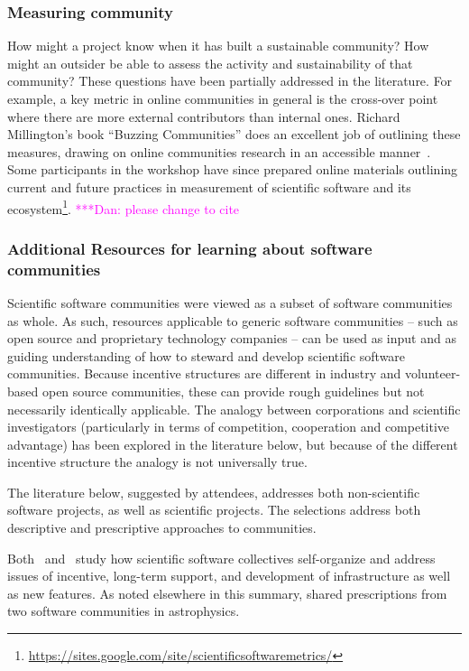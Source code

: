 \documentclass[11pt, oneside]{amsart}
\newcommand{\katznote}[1]{ {\textcolor{magenta}    { ***Dan:      #1 }}}
\begin{document}
\subsubsection{Measuring community}
How might a project know when it has built a sustainable community?  How might an outsider be able to assess the activity and sustainability of that community?  These questions have been partially addressed in the literature.  For example, a key metric in online communities in general is the cross-over point where there are more external contributors than internal ones. Richard Millington's book ``Buzzing Communities'' does an excellent job of outlining these measures, drawing on online communities research in an accessible manner~\cite{millington_buzzing_2012}. Some participants in the workshop have since prepared online materials outlining current and future practices in measurement of scientific software and its ecosystem\footnote{\url{https://sites.google.com/site/scientificsoftwaremetrics/}}. \katznote{please change to cite}

\subsubsection{Additional Resources for learning about software communities}

Scientific software communities were viewed as a subset of software communities
as whole.  As such, resources applicable to generic software communities --
such as open source and proprietary technology companies -- can be used as
input and as guiding understanding of how to steward and develop scientific
software communities.  Because incentive structures are different in industry
and volunteer-based open source communities, these can provide rough guidelines
but not necessarily identically applicable.  The analogy between corporations
and scientific investigators (particularly in terms of competition, cooperation
and competitive advantage) has been explored in the literature below, but
because of the different incentive structure the analogy is not universally
true.

The literature below, suggested by attendees, addresses both non-scientific
software projects, as well as scientific projects.  The selections address both
descriptive and prescriptive approaches to communities.

Both~\cite{howison_scientific_2011} and~\cite{howison_incentives_2013} 
study how scientific software collectives self-organize and address issues of
incentive, long-term support, and development of infrastructure as well as new
features.  As noted elsewhere in this summary,
\cite{Turk:2013:SCH:2484762.2484782} shared prescriptions from two software
communities in astrophysics.
\end{document}
